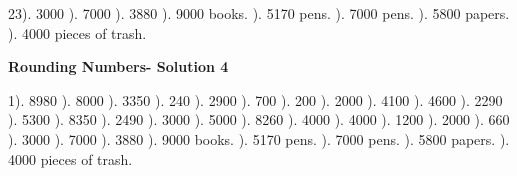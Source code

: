 \documentclass{article}%
\begin{document}
23). 3000%
). 7000%
). 3880%
). 9000 books.%
). 5170 pens.%
). 7000 pens.%
). 5800 papers.%
). 4000 pieces of trash.%
\newline%
\newpage%
\large%
\begin{center}%
\textbf{Rounding Numbers- Solution 4}%
\newline%
\end{center} \normalsize%
1). 8980%
). 8000%
). 3350%
). 240%
). 2900%
). 700%
). 200%
). 2000%
). 4100%
). 4600%
). 2290%
). 5300%
). 8350%
). 2490%
). 3000%
). 5000%
). 8260%
). 4000%
). 4000%
). 1200%
). 2000%
). 660%
). 3000%
). 7000%
). 3880%
). 9000 books.%
). 5170 pens.%
). 7000 pens.%
). 5800 papers.%
). 4000 pieces of trash.%
\newline%
\end{document}
